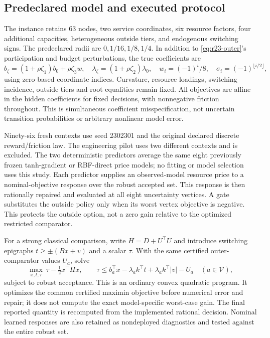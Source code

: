 \subsection{Predeclared model and executed protocol}
The instance retains 63 nodes, two service coordinates, six resource factors, four additional capacities, heterogeneous outside tiers, and endogenous switching signs. The predeclared radii are $0,1/16,1/8,1/4$. In addition to \eqref{eq:r23-outer}'s participation and budget perturbations, the true coefficients are
\[
 b_\zeta=(1+\rho\zeta_1)b_0+\rho\zeta_3w,\quad
 \lambda_\zeta=(1+\rho\zeta_2)\lambda_0,\quad
 w_i=(-1)^i/8,\quad \sigma_i=(-1)^{\lfloor i/2\rfloor},
\]
using zero-based coordinate indices. Curvature, resource loadings, switching incidence, outside tiers and root equalities remain fixed. All objectives are affine in the hidden coefficients for fixed decisions, with nonnegative friction throughout. This is simultaneous coefficient misspecification, not uncertain transition probabilities or arbitrary nonlinear model error.

Ninety-six fresh contexts use seed 2302301 and the original declared discrete reward/friction law. The engineering pilot uses two different contexts and is excluded. The two deterministic predictors average the same eight previously frozen tanh-gradient or RBF-direct price models; no fitting or model selection uses this study. Each predictor supplies an observed-model resource price to a nominal-objective response over the robust accepted set. This response is then rationally repaired and evaluated at all eight uncertainty vertices. A gate substitutes the outside policy only when its worst vertex objective is negative. This protects the outside option, not a zero gain relative to the optimized restricted comparator.

For a strong classical comparison, write $H=D+U^\top U$ and introduce switching epigraphs $t\geq\pm(Bx+v)$ and a scalar $\tau$. With the same certified outer-comparator values $U_a$, solve
\[
 \max_{x,t,\tau}\ \tau-\tfrac12x^\top Hx,\qquad
 \tau\leq b_a^\top x-\lambda_a k^\top t
       +\lambda_a k^\top|v|-U_a\quad(a\in\mathcal V),
\]
subject to robust acceptance. This is an ordinary convex quadratic program. It optimizes the common certified maximin objective before numerical error and repair; it does not compute the exact model-specific worst-case gain. The final reported quantity is recomputed from the implemented rational decision. Nominal learned responses are also retained as nondeployed diagnostics and tested against the entire robust set.

